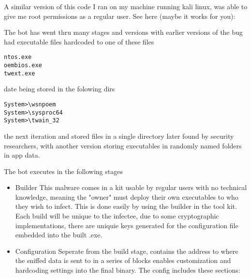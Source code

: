 A similar version of this code I ran on my machine running kali linux,
was able to give me root permissions as a regular user. See here (maybe
it works for you):

\begin{Shaded}
\begin{Highlighting}[]
     \NormalTok{;}
\NormalTok{\}}
     \NormalTok{;}
\NormalTok{\}}
     \NormalTok{;}
\NormalTok{\}}
     \NormalTok{;}
\NormalTok{\}}

\end{Highlighting}
\end{Shaded}

The bot has went thru many stages and versions with earlier versions of
the bug had executable files hardcoded to one of these files

\begin{verbatim}
ntos.exe
oembios.exe
twext.exe
\end{verbatim}

date being stored in the folowing dirs

\begin{verbatim}
System>\wsnpoem 
System>\sysproc64
System>\twain_32
\end{verbatim}

the next iteration and stored files in a single directory later found by
security researchers, with another version storing executables in
randomly named folders in app data.

The bot executes in the following stages

\begin{itemize}
\item
  Builder This malware comes in a kit usable by regular users with no
  technical knowledge, meaning the "owner" must deploy their own
  executables to who they wish to infect. This is done easily by using
  the builder in the tool kit. Each build will be unique to the
  infectee, due to some cryptographic implementations, there are uniquie
  keys generated for the configuration file embedded into the built
  .exe.
\item
  Configuration Seperate from the build stage, contains the address to
  where the sniffed data is sent to in a series of blocks enables
  customization and hardcoding settings into the final binary. The
  config includes these sections:
\end{itemize}

